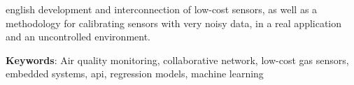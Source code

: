\begin{resumo}[Abstract]
\begin{otherlanguage*}{english}
development and interconnection of low-cost sensors, as well as a methodology for calibrating sensors with very noisy data, in a real application and an uncontrolled environment.

		\textbf{Keywords}: Air quality monitoring, collaborative network, low-cost gas sensors, embedded systems, \acrshort{api}, regression models, machine learning
	\end{otherlanguage*}
\end{resumo}

{%
	\hypersetup{hidelinks}
	\listoffigures*
	\cleardoublepage
	
	\listoftables*
	\cleardoublepage
	
	
	\printnoidxglossary[type=acronym, sort=use, title=Lista de siglas, toctitle=Lista de siglas]
	\cleardoublepage

	\tableofcontents*
	\cleardoublepage
	
}%
